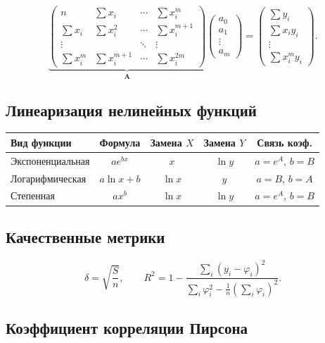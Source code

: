 \documentclass[12pt,a4paper]{article}
\begin{document}
\[
  \underbrace{
  \begin{pmatrix}
    n & \sum x_i & \cdots & \sum x_i^m \\
    \sum x_i & \sum x_i^2 & \cdots & \sum x_i^{m+1} \\
    \vdots & & \ddots & \vdots \\
    \sum x_i^m & \sum x_i^{m+1} & \cdots & \sum x_i^{2m}
  \end{pmatrix}}_{\mathbf{A}}
  \begin{pmatrix} a_0 \\ a_1 \\ \vdots \\ a_m \end{pmatrix}
  =
  \begin{pmatrix} \sum y_i \\ \sum x_i y_i \\ \vdots \\ \sum x_i^m y_i \end{pmatrix}.
\]

\subsection{Линеаризация нелинейных функций}

\begin{center}
\begin{tabular}{lcccc}
\toprule
Вид функции & Формула & Замена $X$ & Замена $Y$ & Связь коэф. \\
\midrule
Экспоненциальная & $ae^{bx}$ & $x$ & $\ln y$ & $a=e^A$, $b=B$ \\
Логарифмическая  & $a\ln x+b$ & $\ln x$ & $y$ & $a=B$, $b=A$ \\
Степенная        & $ax^b$    & $\ln x$ & $\ln y$ & $a=e^A$, $b=B$ \\
\bottomrule
\end{tabular}
\end{center}

\subsection{Качественные метрики}

\[
  \delta = \sqrt{\frac{S}{n}}, \qquad
  R^2 = 1 - \frac{\displaystyle\sum_{i}(y_i - \varphi_i)^2}
                  {\displaystyle\sum_{i}\varphi_i^2 - \tfrac{1}{n}\!\left(\textstyle\sum_{i}\varphi_i\right)^2}.
\]

\subsection{Коэффициент корреляции Пирсона}
\end{document}

